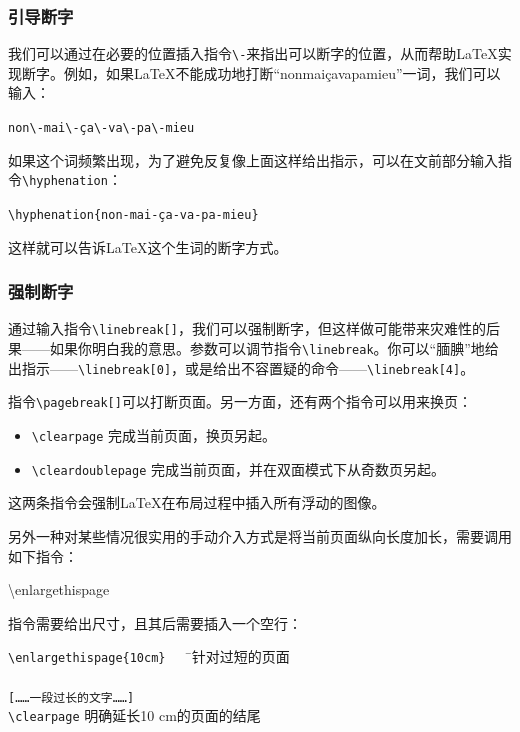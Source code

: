 \subsubsection{引导断字}

我们可以通过在必要的位置插入指令\verb|\-|来指出可以断字的位置，从而帮助\LaTeX 实现断字。例如，如果\LaTeX 不能成功地打断“nonmaiçavapamieu”一词，我们可以输入：

\begin{dmd}
\verb|non\-mai\-ça\-va\-pa\-mieu|
\end{dmd}

如果这个词频繁出现，为了避免反复像上面这样给出指示，可以在文前部分输入指令\linebreak \verb|\hyphenation|：

\begin{dmd}
\verb|\hyphenation{non-mai-ça-va-pa-mieu}|
\end{dmd}

这样就可以告诉\LaTeX 这个生词的断字方式。

\subsubsection{强制断字}

通过输入指令\verb|\linebreak[|\verb|]|，我们可以强制断字，但这样做可能带来灾难性的后果——如果你明白我的意思。参数可以调节指令\verb|\linebreak|。你可以“腼腆”地给出指示——\verb|\linebreak[0]|，或是给出不容置疑的命令——\verb|\linebreak[4]|。

指令\verb|\pagebreak[|\verb|]|可以打断页面。另一方面，还有两个指令可以用来换页：

\begin{itemize}
  \item \verb|\clearpage| 完成当前页面，换页另起。
  \item \verb|\cleardoublepage| 完成当前页面，并在双面模式下从奇数页另起。
\end{itemize}

这两条指令会强制\LaTeX 在布局过程中插入所有浮动的图像。%

\begin{ii}
另外一种对某些情况很实用的手动介入方式是将当前页面纵向长度加长，需要调用如下指令：

\begin{dmd}
  \backslash enlargethispage
\end{dmd}

指令需要给出尺寸，且其后需要插入一个空行：

\begin{tabbing}
  \verb|\enlargethispage{10cm}   | \= \leftarrow 针对过短的页面 \\
  ~\\
  \verb|[……一段过长的文字……]|\\
  \verb|\clearpage| \> \leftarrow 明确延长10 cm的页面的结尾
\end{tabbing}
\end{ii}


